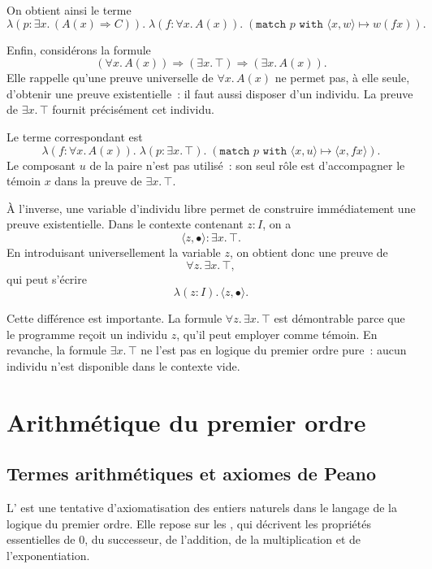 On obtient ainsi le terme
\[
\lambda(p:\exists x.\,(A(x)\Rightarrow C)).\;
\lambda(f:\forall x.\,A(x)).\;
(\texttt{match~}p\texttt{~with~}\langle x,w\rangle\mapsto w(fx)).
\]

\thingy
Enfin, considérons la formule
\[
(\forall x.\,A(x))
\Rightarrow
(\exists x.\,\top)
\Rightarrow
(\exists x.\,A(x)).
\]
Elle rappelle qu'une preuve universelle de $\forall x.\,A(x)$ ne permet
pas, à elle seule, d'obtenir une preuve existentielle : il faut aussi
disposer d'un individu.  La preuve de $\exists x.\,\top$ fournit
précisément cet individu.

Le terme correspondant est
\[
\lambda(f:\forall x.\,A(x)).\;
\lambda(p:\exists x.\,\top).\;
(\texttt{match~}p\texttt{~with~}\langle x,u\rangle\mapsto
\langle x,fx\rangle).
\]
Le composant $u$ de la paire n'est pas utilisé : son seul rôle est
d'accompagner le témoin $x$ dans la preuve de $\exists x.\,\top$.

\thingy
À l'inverse, une variable d'individu libre permet de construire
immédiatement une preuve existentielle.  Dans le contexte contenant
$z:I$, on a
\[
\langle z,\bullet\rangle:\exists x.\,\top.
\]
En introduisant universellement la variable $z$, on obtient donc une
preuve de
\[
\forall z.\,\exists x.\,\top,
\]
qui peut s'écrire
\[
\lambda(z:I).\,\langle z,\bullet\rangle.
\]

Cette différence est importante.  La formule $\forall z.\,\exists
x.\,\top$ est démontrable parce que le programme reçoit un individu
$z$, qu'il peut employer comme témoin.  En revanche, la formule
$\exists x.\,\top$ ne l'est pas en logique du premier ordre pure :
aucun individu n'est disponible dans le contexte vide.



\section{Arithmétique du premier ordre}

\subsection{Termes arithmétiques et axiomes de Peano}

\thingy
L' est une tentative
d'axiomatisation des entiers naturels dans le langage de la logique du
premier ordre.  Elle repose sur les , qui
décrivent les propriétés essentielles de $0$, du successeur, de
l'addition, de la multiplication et de l'exponentiation.

